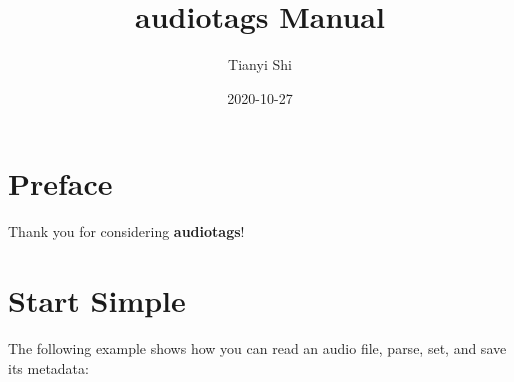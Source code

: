 \documentclass[
]{book}
\title{audiotags Manual}
\author{Tianyi Shi}
\date{2020-10-27}
\begin{document}
\maketitle

{
\setcounter{tocdepth}{1}
\tableofcontents
}
\hypertarget{preface}{%
\chapter*{Preface}\label{preface}}

Thank you for considering \textbf{audiotags}!

\hypertarget{start-simple}{%
\chapter{Start Simple}\label{start-simple}}

The following example shows how you can read an audio file, parse, set, and save its metadata:
\end{document}
